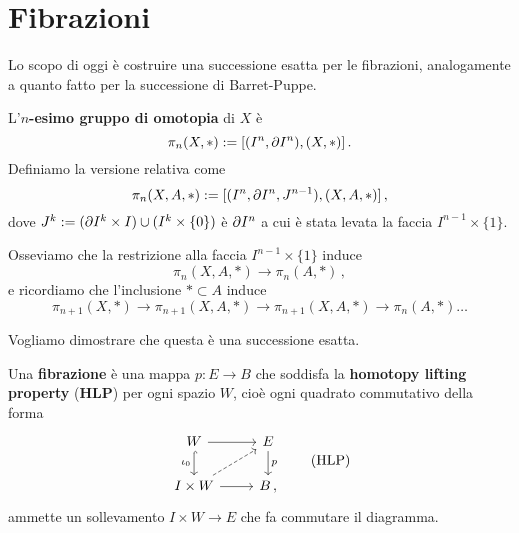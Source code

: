 
\section{Fibrazioni}


Lo scopo di oggi è costruire una successione esatta per
le fibrazioni, analogamente a quanto fatto per la successione
di Barret-Puppe.

\begin{df}
	L'\textbf{$n$-esimo gruppo di omotopia} di $X$ è
	\begin{equation*}
		\pi_{n}(X,\ast) := [(I^{n},\partial I^{n}),(X,\ast)]\,.
	\end{equation*}
	Definiamo la versione relativa come
	\begin{equation*}
		\pi_{n}(X,A,\ast) := [(I^{n},\partial I^{n}, J^{n-1}),(X,A,\ast)]\,,
	\end{equation*}
	dove $J^{k} := (\partial I^{k} \times I) \cup ( I^{k} \times \{0\} )$
	è $\partial I^{n}$ a cui è stata levata la faccia $I^{n-1} \times \{1\}$.
\end{df}

Osseviamo che la restrizione alla faccia $I^{n-1} \times \{1\}$ induce
\begin{equation*}
	\pi_{n}(X,A,\ast) \to \pi_{n}(A,\ast)\,,
\end{equation*}
e ricordiamo che l'inclusione $\ast \subset A$ induce
\begin{equation*}
	\pi_{n+1}(X,\ast) \to \pi_{n+1}(X,A,\ast) \to \pi_{n+1}(X,A,\ast) \to \pi_{n}(A,\ast) \dots
\end{equation*}

Vogliamo dimostrare che questa è una successione esatta.
\begin{df}
	Una \textbf{fibrazione} è una mappa $p:E \to B$ che soddisfa
	la \textbf{homotopy lifting property} (\textbf{HLP}) per ogni spazio $W$,
	cioè ogni quadrato commutativo della forma
	\begin{equation}\label{HLP}
		\begin{tikzcd}
			W \ar[r] \ar[d, "\iota_{0}"', hook] & E \ar[d, "p"] \\
			I \times W \ar[r] \ar[ur, dashed] & B\,,
		\end{tikzcd}\tag{HLP}
	\end{equation}
	ammette un sollevamento $I \times W \to E$ che fa commutare il diagramma.
\end{df}

